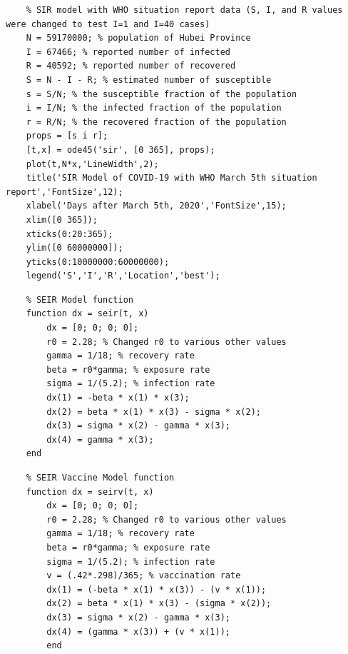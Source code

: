 \documentclass[12pt, a4paper]{article}
\begin{document}
    \newpage
    
    \begin{lstlisting}
    % SIR model with WHO situation report data (S, I, and R values were changed to test I=1 and I=40 cases)
    N = 59170000; % population of Hubei Province
    I = 67466; % reported number of infected
    R = 40592; % reported number of recovered 
    S = N - I - R; % estimated number of susceptible 
    s = S/N; % the susceptible fraction of the population
    i = I/N; % the infected fraction of the population
    r = R/N; % the recovered fraction of the population
    props = [s i r];
    [t,x] = ode45('sir', [0 365], props);
    plot(t,N*x,'LineWidth',2);
    title('SIR Model of COVID-19 with WHO March 5th situation report','FontSize',12);
    xlabel('Days after March 5th, 2020','FontSize',15); 
    xlim([0 365]);
    xticks(0:20:365);
    ylim([0 60000000]);
    yticks(0:10000000:60000000);
    legend('S','I','R','Location','best');
    \end{lstlisting}
    
    \newpage
     
    \begin{lstlisting}
    % SEIR Model function
    function dx = seir(t, x)
        dx = [0; 0; 0; 0];
        r0 = 2.28; % Changed r0 to various other values
        gamma = 1/18; % recovery rate
        beta = r0*gamma; % exposure rate
        sigma = 1/(5.2); % infection rate
        dx(1) = -beta * x(1) * x(3);
        dx(2) = beta * x(1) * x(3) - sigma * x(2);
        dx(3) = sigma * x(2) - gamma * x(3);
        dx(4) = gamma * x(3);
    end
    \end{lstlisting}
    
    \begin{lstlisting}
    % SEIR Vaccine Model function
    function dx = seirv(t, x)
        dx = [0; 0; 0; 0];
        r0 = 2.28; % Changed r0 to various other values
        gamma = 1/18; % recovery rate
        beta = r0*gamma; % exposure rate
        sigma = 1/(5.2); % infection rate
        v = (.42*.298)/365; % vaccination rate
        dx(1) = (-beta * x(1) * x(3)) - (v * x(1));
        dx(2) = beta * x(1) * x(3) - (sigma * x(2));
        dx(3) = sigma * x(2) - gamma * x(3);
        dx(4) = (gamma * x(3)) + (v * x(1));
        end
    \end{lstlisting}
    
    \newpage
    
\end{document}
